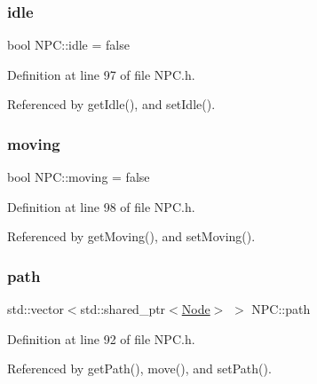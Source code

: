 \mbox{\label{class_n_p_c_aa228d3e449507a6326cef7b449752e62}} 
\subsubsection{\texorpdfstring{idle}{idle}}
{\footnotesize\ttfamily bool N\+P\+C\+::idle = false\hspace{0.3cm}{\ttfamily [private]}}



Definition at line 97 of file N\+P\+C.\+h.



Referenced by get\+Idle(), and set\+Idle().

\mbox{\label{class_n_p_c_a4dfc6a89cae1301e7f722bbba67f3dbb}} 
\subsubsection{\texorpdfstring{moving}{moving}}
{\footnotesize\ttfamily bool N\+P\+C\+::moving = false\hspace{0.3cm}{\ttfamily [private]}}



Definition at line 98 of file N\+P\+C.\+h.



Referenced by get\+Moving(), and set\+Moving().

\mbox{\label{class_n_p_c_afdd6b1a6e4827259ec9d9fcd075cb099}} 
\subsubsection{\texorpdfstring{path}{path}}
{\footnotesize\ttfamily std\+::vector$<$std\+::shared\+\_\+ptr$<$\hyperlink{class_node}{Node}$>$ $>$ N\+P\+C\+::path\hspace{0.3cm}{\ttfamily [private]}}



Definition at line 92 of file N\+P\+C.\+h.



Referenced by get\+Path(), move(), and set\+Path().

\mbox{\label{class_n_p_c_a04d8f196cdd6de84f38131836d9c9cc7}} 
